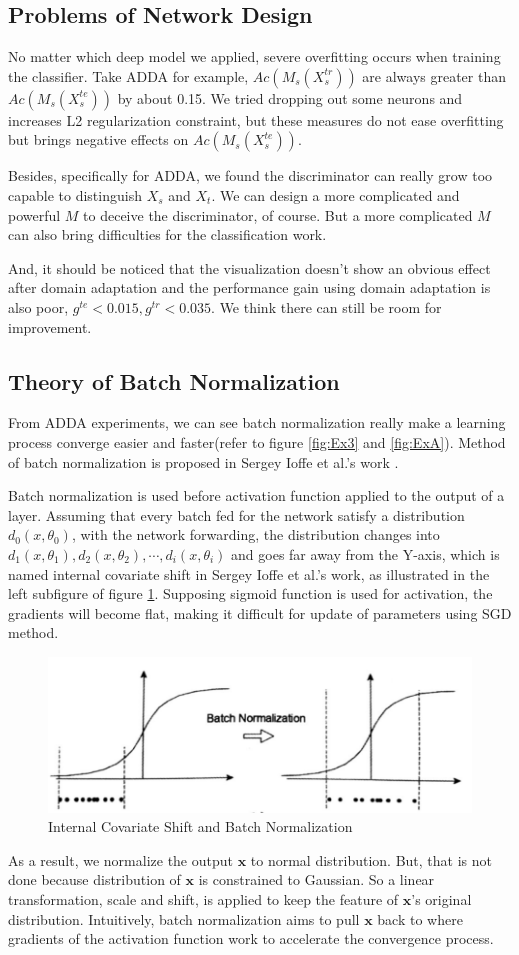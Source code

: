 \documentclass[conference]{IEEEtran}
\begin{document}
\subsection{Problems of Network Design}
No matter which deep model we applied, severe overfitting occurs when training the classifier. Take ADDA for example, $Ac(M_s(X^{tr}_s))$ are always greater than $Ac(M_s(X^{te}_s))$ by about 0.15. We tried dropping out some neurons and increases L2 regularization constraint, but these measures do not ease overfitting but brings negative effects on $Ac(M_s(X^{te}_s))$.

Besides, specifically for ADDA, we found the discriminator can really grow too capable to distinguish $X_s$ and $X_t$. We can design a more complicated and powerful $M$ to deceive the discriminator, of course. But a more complicated $M$ can also bring difficulties for the classification work.

And, it should be noticed that the visualization doesn't show an obvious effect after domain adaptation and the performance gain using domain adaptation is also poor, $g^{te} < 0.015, g^{tr} < 0.035$. We think there can still be room for improvement.

\subsection{Theory of Batch Normalization}
From ADDA experiments, we can see batch normalization really make a learning process converge easier and faster(refer to figure \ref{fig:Ex3} and \ref{fig:ExA}). Method of batch normalization is proposed in Sergey Ioffe et al.'s work \cite{BN1}.

Batch normalization is used before activation function applied to the output of a layer. Assuming that every batch fed for the network satisfy a distribution $d_0(x, \theta_0)$, with the network forwarding, the distribution changes into $d_1(x, \theta_1), d_2(x, \theta_2), \cdots, d_i(x, \theta_i)$ and goes far away from the Y-axis, which is named internal covariate shift in Sergey Ioffe et al.'s work\cite{BN1}, as illustrated in the left subfigure of figure \ref{fig:BN_theorem1}. Supposing sigmoid function is used for activation, the gradients will become flat, making it difficult for update of parameters using SGD method.
\begin{figure}
  \centering
  \includegraphics[width=.4\textwidth]{LBN_theorem1.jpg}
  \caption{Internal Covariate Shift and Batch Normalization}
  \label{fig:BN_theorem1}
\end{figure}
As a result, we normalize the output $\mathbf{x}$ to normal distribution. But, that is not done because distribution of $\mathbf{x}$ is constrained to Gaussian. So a linear transformation, scale and shift, is applied to keep the feature of $\mathbf{x}$'s original distribution. Intuitively, batch normalization aims to pull $\mathbf{x}$ back to where gradients of the activation function work to accelerate the convergence process.
\end{document}

